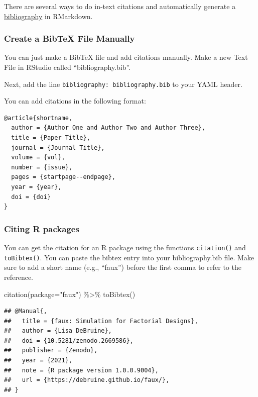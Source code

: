 \documentclass[
  oneside]{book}
\newenvironment{Shaded}{\begin{snugshade}}{\end{snugshade}}
\newcommand{\AttributeTok}[1]{\textcolor[rgb]{0.77,0.63,0.00}{#1}}
\newcommand{\FunctionTok}[1]{\textcolor[rgb]{0.00,0.00,0.00}{#1}}
\newcommand{\NormalTok}[1]{#1}
\newcommand{\SpecialCharTok}[1]{\textcolor[rgb]{0.00,0.00,0.00}{#1}}
\newcommand{\StringTok}[1]{\textcolor[rgb]{0.31,0.60,0.02}{#1}}
\begin{document}
There are several ways to do in-text citations and automatically generate a \href{https://rmarkdown.rstudio.com/authoring_bibliographies_and_citations.html\#bibliographies}{bibliography} in RMarkdown.

\hypertarget{create-a-bibtex-file-manually}{%
\subsubsection{Create a BibTeX File Manually}\label{create-a-bibtex-file-manually}}

You can just make a BibTeX file and add citations manually. Make a new Text File in RStudio called ``bibliography.bib''.

Next, add the line \texttt{bibliography:\ bibliography.bib} to your YAML header.

You can add citations in the following format:

\begin{verbatim}
@article{shortname,
  author = {Author One and Author Two and Author Three},
  title = {Paper Title},
  journal = {Journal Title},
  volume = {vol},
  number = {issue},
  pages = {startpage--endpage},
  year = {year},
  doi = {doi}
}
\end{verbatim}

\hypertarget{citing-r-packages}{%
\subsubsection{Citing R packages}\label{citing-r-packages}}

You can get the citation for an R package using the functions \texttt{citation()} and \texttt{toBibtex()}. You can paste the bibtex entry into your bibliography.bib file. Make sure to add a short name (e.g., ``faux'') before the first comma to refer to the reference.

\begin{Shaded}
\begin{Highlighting}[]
\FunctionTok{citation}\NormalTok{(}\AttributeTok{package=}\StringTok{"faux"}\NormalTok{) }\SpecialCharTok{\%\textgreater{}\%} \FunctionTok{toBibtex}\NormalTok{()}
\end{Highlighting}
\end{Shaded}

\begin{verbatim}
## @Manual{,
##   title = {faux: Simulation for Factorial Designs},
##   author = {Lisa DeBruine},
##   doi = {10.5281/zenodo.2669586},
##   publisher = {Zenodo},
##   year = {2021},
##   note = {R package version 1.0.0.9004},
##   url = {https://debruine.github.io/faux/},
## }
\end{verbatim}
\end{document}
